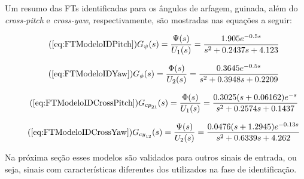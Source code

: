 Um resumo das FTs identificadas para os ângulos de arfagem, guinada, além do \textit{cross-pitch} e \textit{cross-yaw}, respectivamente, são mostradas nas equações a seguir:

\begin{equation}\tag{\ref{eq:FTModeloIDPitch}}
    G_{\psi}(s) = \frac{\Psi(s)}{U_{1}(s)} = \frac{1.905 e^{-0.5 s}}{s^2 + 0.2437 s + 4.123}
\end{equation}

\begin{equation}\tag{\ref{eq:FTModeloIDYaw}}
    G_{\phi}(s) = \frac{\Phi(s)}{U_{2}(s)} = \frac{0.3645 e^{-0.5 s}}{s^2 + 0.3948s + 0.2209}
\end{equation}

\begin{equation}\tag{\ref{eq:FTModeloIDCrossPitch}}
    G_{{cp}_{21}}(s) = \frac{\Phi(s)}{U_{1}(s)} = \frac{0.3025(s+0.06162)e^{-s}}{s^2 + 0.2574 s + 0.1437}
\end{equation}

\begin{equation}\tag{\ref{eq:FTModeloIDCrossYaw}}
    G_{{cy}_{12}}(s) = \frac{\Psi(s)}{U_{2}(s)} = \frac{0.0476(s+1.2945)e^{-0.13s}}{s^2 + 0.6339 s + 4.262}
\end{equation}

Na próxima seção esses modelos são validados para outros sinais de entrada, ou seja, sinais com características diferentes dos utilizados na fase de identificação.